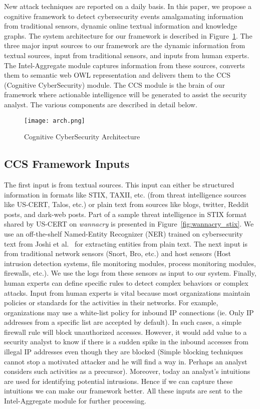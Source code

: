 \label{sec:SystemArchitecture}
New attack techniques are reported on a daily basis.  
In this paper, we propose a cognitive framework to detect cybersecurity events amalgamating information from traditional sensors, dynamic online textual information and knowledge graphs. The system architecture for our framework is described in Figure~\ref{fig:ccs}. The three major input sources to our framework are the dynamic information from textual sources, input from traditional sensors, and inputs from human experts. The Intel-Aggregate module captures information from these sources, converts them to semantic web OWL representation and delivers them to the CCS (Cognitive CyberSecurity) module. The CCS module is the brain of our framework where actionable intelligence will be generated to assist the security analyst. The various components are described in detail below.

\begin{figure}	
	\texttt{[image: arch.png]}
	\caption{Cognitive CyberSecurity Architecture}	
	\label{fig:ccs}
\end{figure}

\subsection{CCS Framework Inputs}
\label{sec:CCSFrameworkInputs}
The first input is from textual sources. This input can either be structured information in formats like STIX, TAXII, etc. (from threat intelligence sources like US-CERT, Talos, etc.) or plain text from sources like blogs, twitter, Reddit posts, and dark-web posts. Part of a sample threat intelligence in STIX format shared by US-CERT on \textit{wannacry} is presented in Figure~\ref{fig:wannacry_stix}. We use an off-the-shelf Named-Entity Recognizer (NER) trained on cybersecurity text from Joshi et al.~\cite{joshi2013extracting} for extracting entities from plain text. The next input is from traditional network sensors (Snort, Bro, etc.) and host sensors (Host intrusion detection systems, file monitoring modules, process monitoring modules, firewalls, etc.). We use the logs from these sensors as input to our system. Finally, human experts can define specific rules to detect complex behaviors or complex attacks. Input from human experts is vital because most organizations maintain policies or standards for the activities in their networks. For example, organizations may use a white-list policy for inbound IP connections (ie. Only IP addresses from a specific list are accepted by default). In such cases, a simple firewall rule will block unauthorized accesses. However, it would add value to a security analyst to know if there is a sudden spike in the inbound accesses from illegal IP addresses even though they are blocked (Simple blocking techniques cannot stop a motivated attacker and he will find a way in. Perhaps an analyst considers such activities as a precursor). Moreover, today an analyst's intuitions are used for identifying potential intrusions. Hence if we can capture these intuitions we can make our framework better. All these inputs are sent to the Intel-Aggregate module for further processing.

